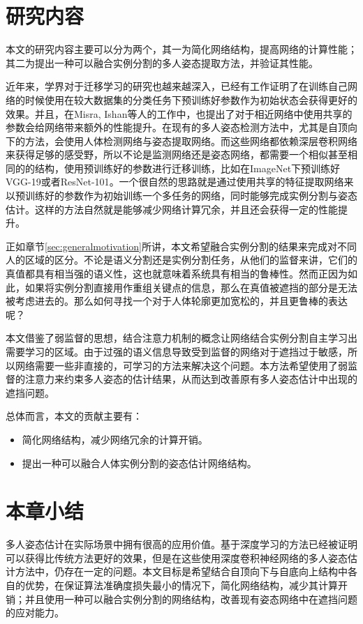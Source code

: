 \section{研究内容}
\label{sec:generalfield}
本文的研究内容主要可以分为两个，其一为简化网络结构，提高网络的计算性能；其二为提出一种可以融合实例分割的多人姿态提取方法，并验证其性能。

近年来，学界对于迁移学习的研究也越来越深入，已经有工作证明了在训练自己网络的时候使用在较大数据集的分类任务下预训练好参数作为初始状态会获得更好的效果\cite{mishkin2015all}。并且，在Misra, Ishan等人\cite{misra2016cross}的工作中，也提出了对于相近网络中使用共享的参数会给网络带来额外的性能提升。在现有的多人姿态检测方法中，尤其是自顶向下的方法，会使用人体检测网络与姿态提取网络。而这些网络都依赖深层卷积网络来获得足够的感受野，所以不论是监测网络还是姿态网络，都需要一个相似甚至相同的的结构，使用预训练好的参数进行迁移训练，比如在ImageNet\cite{deng2009imagenet}下预训练好VGG-19\cite{simonyan2014very}或者ResNet-101\cite{He2015Deep}。一个很自然的思路就是通过使用共享的特征提取网络来以预训练好的参数作为初始训练一个多任务的网络，同时能够完成实例分割与姿态估计。这样的方法自然就是能够减少网络计算冗余，并且还会获得一定的性能提升。

正如章节\ref{sec:generalmotivation}所讲，本文希望融合实例分割的结果来完成对不同人的区域的区分。不论是语义分割还是实例分割任务，从他们的监督来讲，它们的真值都具有相当强的语义性，这也就意味着系统具有相当的鲁棒性。然而正因为如此，如果将实例分割直接用作重组关键点的信息，那么在真值被遮挡的部分是无法被考虑进去的。那么如何寻找一个对于人体轮廓更加宽松的，并且更鲁棒的表达呢？

本文借鉴了弱监督的思想，结合注意力机制的概念让网络结合实例分割自主学习出需要学习的区域。由于过强的语义信息导致受到监督的网络对于遮挡过于敏感，所以网络需要一些非直接的，可学习的方法来解决这个问题。本方法希望使用了弱监督的注意力来约束多人姿态的估计结果，从而达到改善原有多人姿态估计中出现的遮挡问题。

总体而言，本文的贡献主要有：
\begin{itemize}
	\item 简化网络结构，减少网络冗余的计算开销。
	\item 提出一种可以融合人体实例分割的姿态估计网络结构。
\end{itemize}

\section{本章小结}
\label{sec:introconclusion}
多人姿态估计在实际场景中拥有很高的应用价值。基于深度学习的方法已经被证明可以获得比传统方法更好的效果，但是在这些使用深度卷积神经网络的多人姿态估计方法中，仍存在一定的问题。本文目标是希望结合自顶向下与自底向上结构中各自的优势，在保证算法准确度损失最小的情况下，简化网络结构，减少其计算开销；并且使用一种可以融合实例分割的网络结构，改善现有姿态网络中在遮挡问题的应对能力。